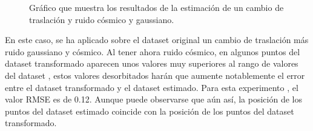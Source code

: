 \begin{figure}
\begin{center}
\hspace{0.5cm}

\end{center}

\caption{Gráfico que muestra los resultados de la estimación de un cambio de traslación y ruido cósmico y gaussiano.}
\end{figure}
En este caso, se ha aplicado sobre el dataset original un cambio de traslación más ruido gaussiano y cósmico. Al tener ahora ruido cósmico, en algunos puntos del dataset transformado aparecen unos valores muy superiores al rango de valores del dataset , estos valores desorbitados harán que aumente notablemente el error entre el dataset transformado y el dataset estimado. Para esta experimento , el valor RMSE es de 0.12. Aunque puede observarse que aún así, la posición de los puntos del dataset estimado coincide con la posición de los puntos del dataset transformado.



